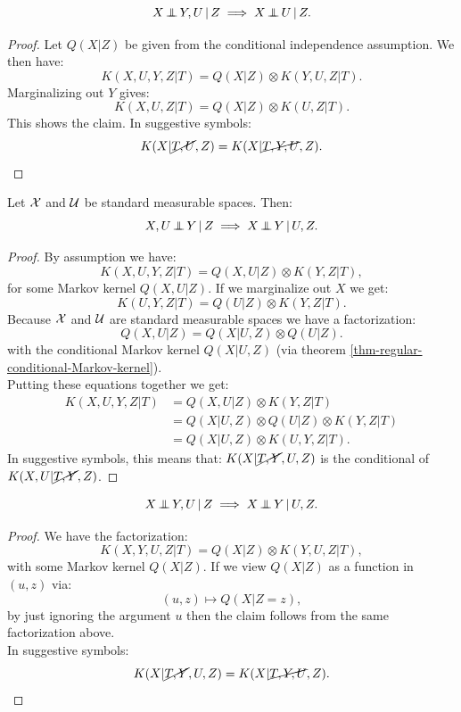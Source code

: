 \begin{Lem}
    \[X \operatorname*{\perp\mkern-11mu\perp}  Y,U \operatorname*{|} Z \implies X \operatorname*{\perp\mkern-11mu\perp}  U \operatorname*{|} Z.\]
\begin{proof}
    Let $Q(X|Z)$ be given from the conditional independence assumption. 
    We then have:
    \[ K(X,U,Y,Z|T) = Q(X|Z) \otimes K(Y,U,Z|T).\]
    Marginalizing out $Y$ gives:
    \[ K(X,U,Z|T) = Q(X|Z) \otimes K(U,Z|T).\]
    This shows the claim.
In suggestive symbols:
\[ K(X|\cancel{T,U},Z) = K(X|\cancel{T,Y,U},Z). \]
\end{proof}
\end{Lem}

\begin{Lem} Let $\mathcal{X}$ and $\mathcal{U}$ be standard measurable spaces. Then:
    \[X , U \operatorname*{\perp\mkern-11mu\perp}  Y  \operatorname*{|} Z \implies X \operatorname*{\perp\mkern-11mu\perp}  Y \operatorname*{|} U,Z.\]
\begin{proof}
    By assumption we have:
    \[K(X,U,Y,Z|T) = Q(X,U|Z) \otimes K(Y,Z|T),\]
    for some Markov kernel $Q(X,U|Z)$. 
    If we marginalize out $X$ we get:
    \[K(U,Y,Z|T) = Q(U|Z) \otimes K(Y,Z|T).\]
    Because $\mathcal{X}$ and $\mathcal{U}$ are standard measurable spaces
    we have a factorization:
    \[ Q(X,U|Z) = Q(X|U,Z) \otimes Q(U|Z).\]
    with the conditional Markov kernel $Q(X|U,Z)$ (via theorem \ref{thm-regular-conditional-Markov-kernel}).\\
    Putting these equations together we get:
    \begin{align*}
        K(X,U,Y,Z|T) &= Q(X,U|Z) \otimes K(Y,Z|T)\\
                     &= Q(X|U,Z) \otimes Q(U|Z) \otimes K(Y,Z|T) \\
                     &= Q(X|U,Z) \otimes  K(U,Y,Z|T).
    \end{align*}
  In suggestive symbols, this means that:
  $K(X|\cancel{T,Y},U,Z)$ is the conditional of $K(X,U|\cancel{T,Y},Z)$.
\end{proof}
\end{Lem}

\begin{Lem} 
    \[X \operatorname*{\perp\mkern-11mu\perp}  Y , U \operatorname*{|} Z \implies X \operatorname*{\perp\mkern-11mu\perp}  Y \operatorname*{|} U , Z.\]
\begin{proof}
    We have the factorization:
    \[K(X,Y,U,Z|T) = Q(X|Z) \otimes K(Y,U,Z|T),\]
    with some Markov kernel $Q(X|Z)$. If we view $Q(X|Z)$ as a function in $(u,z)$ via:
    \[ (u,z) \mapsto Q(X|Z=z), \]
    by just ignoring the argument $u$ then the claim follows from the same factorization above.\\
    In suggestive symbols:
    \[K(X|\cancel{T,Y},U,Z) = K(X|\cancel{T,Y,U},Z).\]
\end{proof}
\end{Lem}

